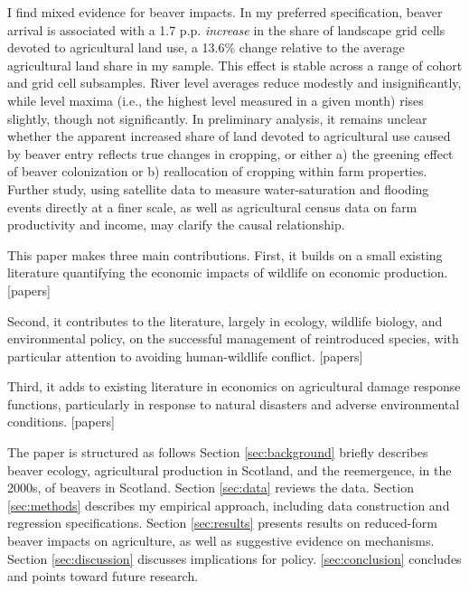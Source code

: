 I find mixed evidence for beaver impacts. In my preferred specification, beaver arrival is associated with a 1.7 p.p. \textit{increase} in the share of landscape grid cells devoted to agricultural land use, a 13.6\% change relative to the average agricultural land share in my sample. This effect is stable across a range of cohort and grid cell subsamples. River level averages reduce modestly and insignificantly, while level maxima (i.e., the highest level measured in a given month) rises slightly, though not significantly. In preliminary analysis, it remains unclear whether the apparent increased share of land devoted to agricultural use caused by beaver entry reflects true changes in cropping, or either a) the greening effect of beaver colonization or b) reallocation of cropping within farm properties. Further study, using satellite data to measure water-saturation and flooding events directly at a finer scale, as well as agricultural census data on farm productivity and income, may clarify the causal relationship.

This paper makes three main contributions. First, it builds on a small existing literature quantifying the economic impacts of wildlife on economic production. [papers]

Second, it contributes to the literature, largely in ecology, wildlife biology, and environmental policy, on the successful management of reintroduced species, with particular attention to avoiding human-wildlife conflict. [papers]

Third, it adds to existing literature in economics on agricultural damage response functions, particularly in response to natural disasters and adverse environmental conditions. [papers]

The paper is structured as follows Section \ref{sec:background} briefly describes beaver ecology, agricultural production in Scotland, and the reemergence, in the 2000s, of beavers in Scotland. Section \ref{sec:data} reviews the data. Section \ref{sec:methods} describes my empirical approach, including data construction and regression specifications. Section \ref{sec:results} presents results on reduced-form beaver impacts on agriculture, as well as suggestive evidence on mechanisms. Section \ref{sec:discussion} discusses implications for policy. \ref{sec:conclusion} concludes and points toward future research.